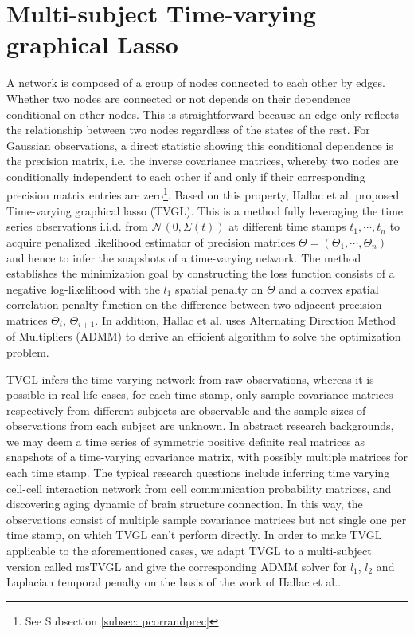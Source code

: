 \section{Multi-subject Time-varying graphical Lasso}

A network is composed of a group of nodes connected to each other by edges. 
Whether two nodes are connected or not depends on their dependence conditional on other nodes.
This is straightforward because an edge only reflects the relationship between two nodes regardless of the states of the rest. 
For Gaussian observations, a direct statistic showing this conditional dependence is the precision matrix, i.e. the inverse covariance matrices, 
whereby two nodes are conditionally independent to each other if and only if their corresponding precision matrix entries are zero\footnote{See Subsection \ref{subsec: pcorrandprec}}.
Based on this property, 
Hallac et al.\cite{hallac2017networkinferencetimevaryinggraphical} proposed Time-varying graphical lasso (TVGL).  
This is a method fully leveraging the time series observations i.i.d. from $\mathcal{N}(0,\Sigma(t))$ at different time stamps $t_1,\cdots,t_n$  
to acquire penalized likelihood estimator of precision matrices $\Theta=(\Theta_1, \cdots, \Theta_n)$
and hence to infer the snapshots of a time-varying network.
The method establishes the minimization goal by constructing the loss function consists of a negative log-likelihood with 
the $l_1$ spatial penalty on $\Theta$ and a convex spatial correlation penalty function on the difference between two adjacent precision matrices $\Theta_i$, $\Theta_{i+1}$. 
In addition, Hallac et al.\cite{hallac2017networkinferencetimevaryinggraphical} uses Alternating Direction Method of
Multipliers (ADMM) to derive an efficient algorithm to solve the optimization problem. 

TVGL infers the time-varying network from raw observations, 
whereas it is possible in real-life cases, for each time stamp, 
only sample covariance matrices respectively from different subjects are observable and the sample sizes of observations from each subject are unknown.
In abstract research backgrounds, we may deem a time series of symmetric positive definite real matrices as snapshots of a time-varying covariance matrix, 
with possibly multiple matrices for each time stamp. 
The typical research questions include inferring time varying cell-cell interaction network from cell communication probability matrices, 
and discovering aging dynamic of brain structure connection. 
In this way, the observations consist of multiple sample covariance matrices but not single one per time stamp, 
on which TVGL can't perform directly.
In order to make TVGL applicable to the aforementioned cases, 
we adapt TVGL to a multi-subject version called msTVGL and give the corresponding ADMM solver for $l_1$, $l_2$ and Laplacian temporal penalty on the basis of the work of Hallac et al.\cite{hallac2017networkinferencetimevaryinggraphical}. 

